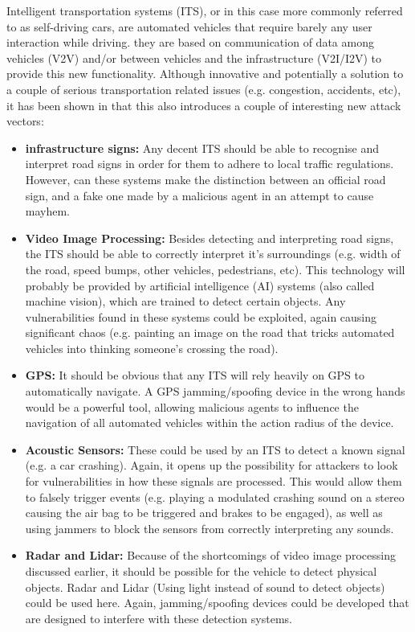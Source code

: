 Intelligent transportation systems (ITS), or in this case more commonly referred to as self-driving cars, are automated vehicles that require barely any user interaction while driving. they are based on communication of data among vehicles (V2V) and/or between vehicles and the infrastructure (V2I/I2V) to provide this new functionality. Although innovative and potentially a solution to a couple of serious transportation related issues (e.g. congestion, accidents, etc), it has been shown in \cite{Petit} that this also introduces a couple of interesting new attack vectors:   

\begin{itemize}
	\item \textbf{infrastructure signs:} Any decent ITS should be able to recognise and interpret road signs in order for them to adhere to local traffic regulations. However, can these systems make the distinction between an official road sign, and a fake one made by a malicious agent in an attempt to cause mayhem. 
	
	\item \textbf{Video Image Processing:} Besides detecting and interpreting road signs, the ITS should be able to correctly interpret it's surroundings (e.g. width of the road, speed bumps, other vehicles, pedestrians, etc). This technology will probably be provided by artificial intelligence (AI) systems (also called machine vision), which are trained to detect certain objects. Any vulnerabilities found in these systems could be exploited, again causing significant chaos (e.g. painting an image on the road that tricks automated vehicles into thinking someone's crossing the road).
	
	\item \textbf{GPS:} It should be obvious that any ITS will rely heavily on GPS to automatically navigate. A GPS jamming/spoofing device in the wrong hands would be a powerful tool, allowing malicious agents to influence the navigation of all automated vehicles within the action radius of the device.
	
	\item \textbf{Acoustic Sensors:} These could be used by an ITS to detect a known signal (e.g. a car crashing). Again, it opens up the possibility for attackers to look for vulnerabilities in how these signals are processed. This would allow them to falsely trigger events (e.g. playing a modulated crashing sound on a stereo causing the air bag to be triggered and brakes to be engaged), as well as using jammers to block the sensors from correctly interpreting any sounds.
	
	\item \textbf{Radar and Lidar:} Because of the shortcomings of video image processing discussed earlier, it should be possible for the vehicle to detect physical objects. Radar and Lidar (Using light instead of sound to detect objects) could be used here. Again, jamming/spoofing devices could be developed that are designed to interfere with these detection systems.
\end{itemize}

